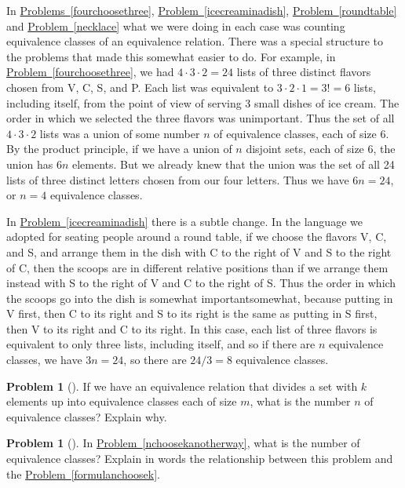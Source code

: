 \documentclass[10pt,]{book}
\theoremstyle{plain}
\theoremstyle{definition}
\newtheorem{activity}[project]{Problem}
\theoremstyle{definition}
\numberwithin{equation}{chapter}
\begin{document}
In \hyperref[fourchoosethree]{Problems~\ref{fourchoosethree}}, \hyperref[icecreaminadish]{Problem~\ref{icecreaminadish}}, \hyperref[roundtable]{Problem~\ref{roundtable}} and \hyperref[necklace]{Problem~\ref{necklace}} what we were doing in each case was counting equivalence classes of an equivalence relation. There was a special structure to the problems that made this somewhat easier to do. For example, in \hyperref[fourchoosethree]{Problem~\ref{fourchoosethree}}, we had \(4\cdot3\cdot2 =24\) lists of three distinct flavors chosen from V, C, S, and P. Each list was equivalent to \(3\cdot2\cdot1=3!=6\) lists, including itself, from the point of view of serving 3 small dishes of ice cream. The order in which we selected the three flavors was unimportant. Thus the set of all \(4\cdot3\cdot2\) lists was a union of some number \(n\) of equivalence classes, each of size 6. By the product principle, if we have a union of \(n\) disjoint sets, each of size 6, the union has \(6n\) elements. But we already knew that the union was the set of all 24 lists of three distinct letters chosen from our four letters. Thus we have \(6n=24\), or \(n=4\) equivalence classes.%
\par
In \hyperref[icecreaminadish]{Problem~\ref{icecreaminadish}} there is a subtle change. In the language we adopted for seating people around a round table, if we choose the flavors V, C, and S, and arrange them in the dish with C to the right of V and S to the right of C, then the scoops are in different relative positions than if we arrange them instead with S to the right of V and C to the right of S. Thus the order in which the scoops go into the dish is somewhat important\textemdash{}somewhat, because putting in V first, then C to its right and S to its right is the same as putting in S first, then V to its right and C to its right. In this case, each list of three flavors is equivalent to only three lists, including itself, and so if there are \(n\) equivalence classes, we have \(3n=24\), so there are \(24/3=8\) equivalence classes.%
\begin{activity}[]\marginsymbol[-1em]{} \label{EquivPrincipleProblem}
If we have an equivalence relation that divides a set with \(k\) elements up into equivalence classes each of size \(m\), what is the number \(n\) of equivalence classes? Explain why.%
\end{activity}
\begin{activity}[]\marginsymbol[-1em]{} \label{activity-357}
In \hyperref[nchoosekanotherway]{Problem~\ref{nchoosekanotherway}}, what is the number of equivalence classes? Explain in words the relationship between this problem and the \hyperref[formulanchoosek]{Problem~\ref{formulanchoosek}}.%
\end{activity}
\end{document}
